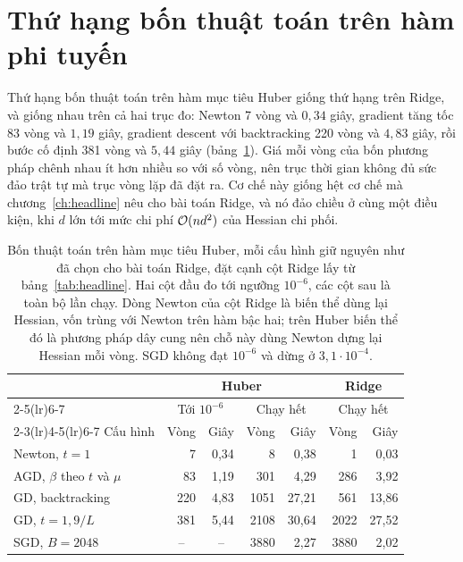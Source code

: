 \documentclass[12pt, a4paper, oneside]{report}
\theoremstyle{definition}
\begin{document}
\section{Thứ hạng bốn thuật toán trên hàm phi tuyến}

Thứ hạng bốn thuật toán trên hàm mục tiêu Huber giống thứ hạng trên Ridge, và
giống nhau trên cả hai trục đo: Newton 7 vòng và $0{,}34$ giây, gradient tăng tốc
83 vòng và $1{,}19$ giây, gradient descent với backtracking 220 vòng và $4{,}83$
giây, rồi bước cố định 381 vòng và $5{,}44$ giây (bảng~\ref{tab:huber-headline}).
Giá mỗi vòng của bốn phương pháp chênh nhau ít hơn nhiều so với số vòng, nên trục
thời gian không đủ sức đảo trật tự mà trục vòng lặp đã đặt ra. Cơ chế này giống
hệt cơ chế mà chương~\ref{ch:headline} nêu cho bài toán Ridge, và nó đảo chiều ở
cùng một điều kiện, khi $d$ lớn tới mức chi phí $\mathcal{O}(nd^{2})$ của Hessian chi
phối.

\begin{table}[tbp]
  \centering
  \caption{Bốn thuật toán trên hàm mục tiêu Huber, mỗi cấu hình giữ nguyên như đã
    chọn cho bài toán Ridge, đặt cạnh cột Ridge lấy từ bảng~\ref{tab:headline}.
    Hai cột đầu đo tới ngưỡng $10^{-6}$, các cột sau là toàn bộ lần chạy. Dòng
    Newton của cột Ridge là biến thể dùng lại Hessian, vốn trùng với Newton trên
    hàm bậc hai; trên Huber biến thể đó là phương pháp dây cung nên chỗ này dùng
    Newton dựng lại Hessian mỗi vòng. SGD không đạt $10^{-6}$ và dừng ở
    $3{,}1 \cdot 10^{-4}$.}
  \label{tab:huber-headline}
  \begin{tabular}{lrrrrrr}
    \toprule
    & \multicolumn{4}{c}{Huber} & \multicolumn{2}{c}{Ridge} \\
    \cmidrule(lr){2-5}\cmidrule(lr){6-7}
    & \multicolumn{2}{c}{Tới $10^{-6}$} & \multicolumn{2}{c}{Chạy hết} & \multicolumn{2}{c}{Chạy hết} \\
    \cmidrule(lr){2-3}\cmidrule(lr){4-5}\cmidrule(lr){6-7}
    Cấu hình & Vòng & Giây & Vòng & Giây & Vòng & Giây \\
    \midrule
    Newton, $t = 1$                & 7   & 0{,}34 & 8    & 0{,}38  & 1    & 0{,}03  \\
    AGD, $\beta$ theo $t$ và $\mu$ & 83  & 1{,}19 & 301  & 4{,}29  & 286  & 3{,}92  \\
    GD, backtracking               & 220 & 4{,}83 & 1051 & 27{,}21 & 561  & 13{,}86 \\
    GD, $t = 1{,}9/L$              & 381 & 5{,}44 & 2108 & 30{,}64 & 2022 & 27{,}52 \\
    SGD, $B = 2048$                & \multicolumn{1}{c}{--} & \multicolumn{1}{c}{--} & 3880 & 2{,}27 & 3880 & 2{,}02 \\
    \bottomrule
  \end{tabular}
\end{table}
\end{document}
